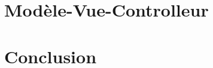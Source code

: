 \documentclass[utf8]{article}
\begin{document}
\begin{large}
\section{Modèle-Vue-Controlleur}
\par
\indent
\par
\section{Conclusion}
\par
\indent

\par

\end{large}
\end{document}
